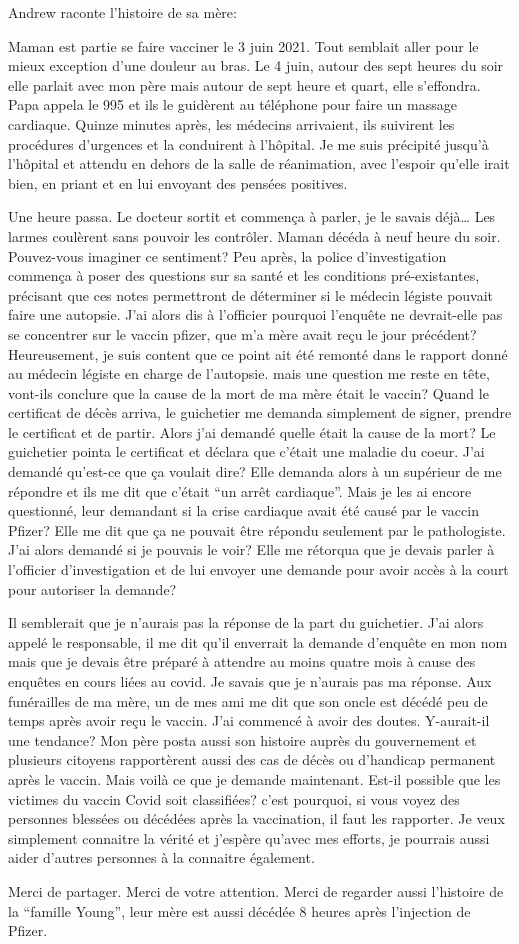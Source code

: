 Andrew raconte l'histoire de sa mère:

Maman est partie se faire vacciner le 3 juin 2021. Tout semblait aller pour le
mieux exception d'une douleur au bras. Le 4 juin, autour des sept heures du soir
elle parlait avec mon père mais autour de sept heure et quart, elle
s'effondra. Papa appela le 995 et ils le guidèrent au téléphone pour faire un
massage cardiaque. Quinze minutes après, les médecins arrivaient, ils suivirent
les procédures d'urgences et la conduirent à l'hôpital. Je me suis précipité
jusqu'à l'hôpital et attendu en dehors de la salle de réanimation, avec l'espoir
qu'elle irait bien, en priant et en lui envoyant des pensées positives.

Une heure passa. Le docteur sortit et commença à parler, je le savais déjà… Les
larmes coulèrent sans pouvoir les contrôler. Maman décéda à neuf heure du
soir. Pouvez-vous imaginer ce sentiment? Peu après, la police d'investigation
commença à poser des questions sur sa santé et les conditions pré-existantes,
précisant que ces notes permettront de déterminer si le médecin légiste pouvait
faire une autopsie. J'ai alors dis à l'officier pourquoi l'enquête ne
devrait-elle pas se concentrer sur le vaccin pfizer, que m'a mère avait reçu le
jour précédent? Heureusement, je suis content que ce point ait été remonté dans
le rapport donné au médecin légiste en charge de l'autopsie. mais une question
me reste en tête, vont-ils conclure que la cause de la mort de ma mère était le
vaccin? Quand le certificat de décès arriva, le guichetier me demanda simplement
de signer, prendre le certificat et de partir. Alors j'ai demandé quelle était
la cause de la mort? Le guichetier pointa le certificat et déclara que c'était
une maladie du coeur. J'ai demandé qu'est-ce que ça voulait dire? Elle demanda
alors à un supérieur de me répondre et ils me dit que c'était “un arrêt
cardiaque”. Mais je les ai encore questionné, leur demandant si la crise
cardiaque avait été causé par le vaccin Pfizer? Elle me dit que ça ne pouvait
être répondu seulement par le pathologiste. J'ai alors demandé si je pouvais le
voir? Elle me rétorqua que je devais parler à l'officier d'investigation et de
lui envoyer une demande pour avoir accès à la court pour autoriser la demande?

Il semblerait que je n'aurais pas la réponse de la part du guichetier. J'ai
alors appelé le responsable, il me dit qu'il enverrait la demande d'enquête en
mon nom mais que je devais être préparé à attendre au moins quatre mois à cause
des enquêtes en cours liées au covid. Je savais que je n'aurais pas ma
réponse. Aux funérailles de ma mère, un de mes ami me dit que son oncle est
décédé peu de temps après avoir reçu le vaccin. J'ai commencé à avoir des
doutes. Y-aurait-il une tendance? Mon père posta aussi son histoire auprès du
gouvernement et plusieurs citoyens rapportèrent aussi des cas de décès ou
d'handicap permanent après le vaccin. Mais voilà ce que je demande
maintenant. Est-il possible que les victimes du vaccin Covid soit classifiées?
c'est pourquoi, si vous voyez des personnes blessées ou décédées après la
vaccination, il faut les rapporter. Je veux simplement connaitre la vérité et
j'espère qu'avec mes efforts, je pourrais aussi aider d'autres personnes à la
connaitre également.

Merci de partager. Merci de votre attention. Merci de regarder aussi l'histoire
de la “famille Young”, leur mère est aussi décédée 8 heures après l'injection de
Pfizer.

